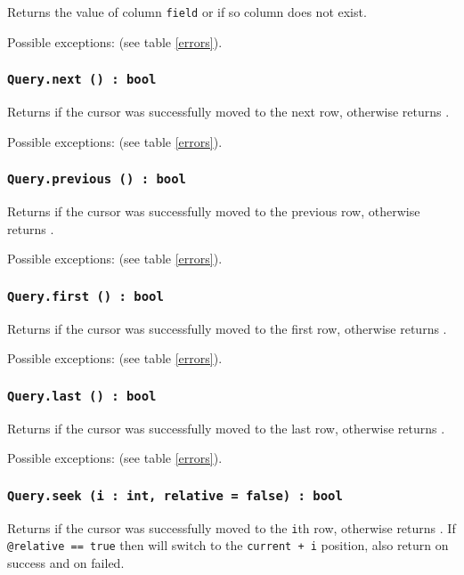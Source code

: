 Returns the value of column \texttt{field} or \void{} if so column does not exist.

Possible exceptions:  (see table \ref{errors}).

\subsubsection{\texttt{Query.next () : bool}}

Returns \true{} if the cursor was successfully moved to the next row, otherwise returns \false.

Possible exceptions:  (see table \ref{errors}).

\subsubsection{\texttt{Query.previous () : bool}}

Returns \true{} if the cursor was successfully moved to the previous row, otherwise returns \false.

Possible exceptions:  (see table \ref{errors}).

\subsubsection{\texttt{Query.first () : bool}}

Returns \true{} if the cursor was successfully moved to the first row, otherwise returns \false.

Possible exceptions:  (see table \ref{errors}).

\subsubsection{\texttt{Query.last () : bool}}

Returns \true{} if the cursor was successfully moved to the last row, otherwise returns \false.

Possible exceptions:  (see table \ref{errors}).

\subsubsection{\texttt{Query.seek (i : int, relative = false) : bool}}

Returns \true{} if the cursor was successfully moved to the \texttt{i}th row, otherwise returns \false. If \texttt{@relative == true} then will switch to the \texttt{current + i} position, also return \true{} on success and \false{} on failed.

